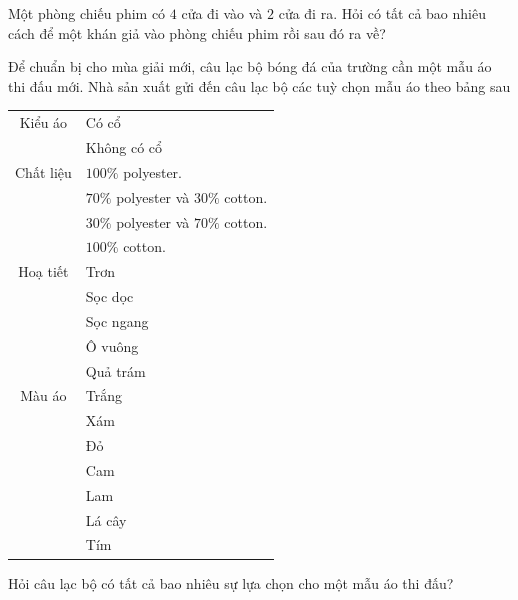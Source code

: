 \begin{bt}%
	Một phòng chiếu phim có $4$ cửa đi vào và $2$ cửa đi ra. Hỏi có tất cả bao nhiêu cách để một khán giả vào phòng chiếu phim rồi sau đó ra về?
\end{bt}

\begin{bt}%
	Để chuẩn bị cho mùa giải mới, câu lạc bộ bóng đá của trường cần một mẫu áo thi đấu mới. Nhà sản xuất gửi đến câu lạc bộ các tuỳ chọn mẫu áo theo bảng sau
	\begin{center}
		\begin{tabular}{|c|l|}
			\hline
			Kiểu áo & Có cổ\\
			& Không có cổ\\
			\hline 
			Chất liệu & $100 \%$ polyester.\\
			&	 $70\%$ polyester và $30\%$ cotton.\\
			& $30\%$ polyester và $70\%$ cotton.\\
			& $100 \%$ cotton.\\
			\hline 
			Hoạ tiết& Trơn\\
			& Sọc dọc\\
			& Sọc ngang\\
			& Ô vuông\\
			& Quả trám
			\\
			\hline 
			Màu áo & Trắng\\
			& Xám\\
			& Đỏ\\
			& Cam\\
			& Lam\\
			& Lá cây\\
			& Tím\\
			\hline 
		\end{tabular}
	\end{center}
	Hỏi câu lạc bộ có tất cả bao nhiêu sự lựa chọn cho một mẫu áo thi đấu?
\end{bt}

